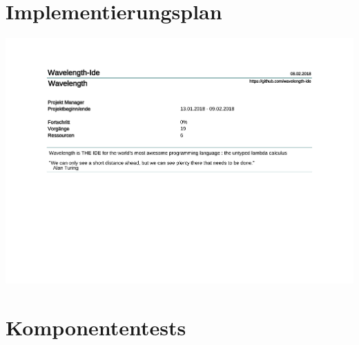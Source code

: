 \documentclass[parskip=full,11pt,twoside]{scrartcl}
\begin{document}
\section{Implementierungsplan}
\hspace*{-2cm}
\includegraphics[trim={0, 0, 6cm, 0}, clip, scale=0.7, page=4]{Implementierungsplan/Implementierungsplan.pdf}

\section{Komponententests}
\end{document}
